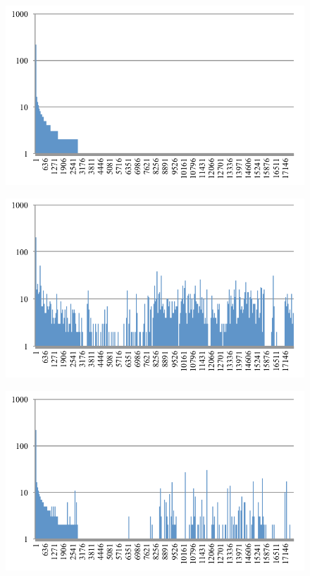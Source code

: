 \documentclass[conference]{IEEEtran}
\begin{document}
\begin{figure}[bt]
  \centering
  \begin{minipage}[b]{0.48\linewidth}
    \includegraphics[clip,width=1.0\columnwidth]{images/ORI_ASM}%
    \label{fig:asm-5gram-original-histogram}%
  \end{minipage}
  \begin{minipage}[b]{0.48\linewidth}
    \includegraphics[clip,width=1.0\columnwidth]{images/ALL_ASM}%
    \label{fig:asm-5gram-ALL-histogram}%
  \end{minipage}\vspace{0.5cm}
  \begin{minipage}[b]{0.48\linewidth}
    \includegraphics[clip,width=1.0\columnwidth]{images/DR_ASM}%

\end{minipage}
\end{figure}
\end{document}
